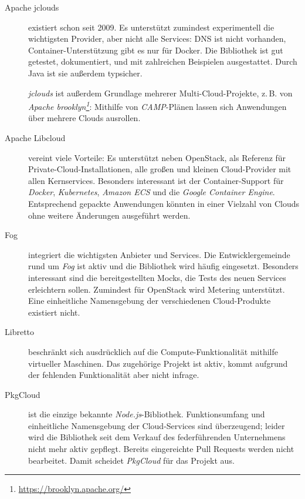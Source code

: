 \begin{description}
	
	\item[Apache jclouds] existiert schon seit 2009. Es unterstützt zumindest experimentell die wichtigsten Provider, aber nicht alle Services: DNS ist nicht vorhanden, Container-Unterstützung gibt es nur für Docker. Die Bibliothek ist gut getestet, dokumentiert, und mit zahlreichen Beispielen ausgestattet. Durch Java ist sie außerdem typsicher. 
	
	\emph{jclouds} ist außerdem Grundlage mehrerer Multi-Cloud-Projekte, z.\,B. von \emph{Apache brooklyn\footnote{\url{https://brooklyn.apache.org/}}}: Mithilfe von \emph{CAMP}-Plänen lassen sich Anwendungen über mehrere Clouds ausrollen.
	
	\item[Apache Libcloud] vereint viele Vorteile: Es unterstützt neben OpenStack, als Referenz für Private-Cloud-Installationen, alle großen und kleinen Cloud-Provider mit allen Kernservices. Besonders interessant ist der Container-Support für \emph{Docker}, \emph{Kubernetes}, \emph{Amazon ECS} und die \emph{Google Container Engine}. Entsprechend gepackte Anwendungen könnten in einer Vielzahl von Clouds ohne weitere Änderungen ausgeführt werden.
	
	\item[Fog] integriert die wichtigsten Anbieter und Services. Die Entwicklergemeinde rund um \emph{Fog} ist aktiv und die Bibliothek wird häufig eingesetzt. Besonders interessant sind die bereitgestellten Mocks, die Tests des neuen Services erleichtern sollen. Zumindest für OpenStack wird Metering unterstützt. Eine einheitliche Namensgebung der verschiedenen Cloud-Produkte existiert nicht.
	
	\item[Libretto] beschränkt sich ausdrücklich auf die Compute-Funktionalität mithilfe virtueller Maschinen. Das zugehörige Projekt ist aktiv, kommt aufgrund der fehlenden Funktionalität aber nicht infrage.
	
	\item[PkgCloud] ist die einzige bekannte \emph{Node.js}-Bibliothek. Funktionsumfang und einheitliche Namensgebung der Cloud-Services sind überzeugend; leider wird die Bibliothek seit dem Verkauf des federführenden Unternehmens nicht mehr aktiv gepflegt. Bereits eingereichte Pull Requests werden nicht bearbeitet. Damit scheidet \emph{PkgCloud} für das Projekt aus.
	
\end{description}

